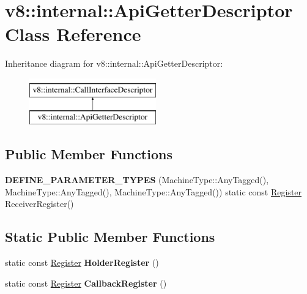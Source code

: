 \hypertarget{classv8_1_1internal_1_1ApiGetterDescriptor}{}\section{v8\+:\+:internal\+:\+:Api\+Getter\+Descriptor Class Reference}
\label{classv8_1_1internal_1_1ApiGetterDescriptor}
Inheritance diagram for v8\+:\+:internal\+:\+:Api\+Getter\+Descriptor\+:\begin{figure}[H]
\begin{center}
\leavevmode
\includegraphics[height=2.000000cm]{classv8_1_1internal_1_1ApiGetterDescriptor}
\end{center}
\end{figure}
\subsection*{Public Member Functions}
\begin{DoxyCompactItemize}
\item 
\mbox{\label{classv8_1_1internal_1_1ApiGetterDescriptor_ae461b846579b9b7371ec3172871acedd}} 
{\bfseries D\+E\+F\+I\+N\+E\+\_\+\+P\+A\+R\+A\+M\+E\+T\+E\+R\+\_\+\+T\+Y\+P\+ES} (Machine\+Type\+::\+Any\+Tagged(), Machine\+Type\+::\+Any\+Tagged(), Machine\+Type\+::\+Any\+Tagged()) static const \mbox{\hyperlink{classv8_1_1internal_1_1Register}{Register}} Receiver\+Register()
\end{DoxyCompactItemize}
\subsection*{Static Public Member Functions}
\begin{DoxyCompactItemize}
\item 
\mbox{\label{classv8_1_1internal_1_1ApiGetterDescriptor_a3a2ad818edc83502718c466b5dad01b5}} 
static const \mbox{\hyperlink{classv8_1_1internal_1_1Register}{Register}} {\bfseries Holder\+Register} ()
\item 
\mbox{\label{classv8_1_1internal_1_1ApiGetterDescriptor_a1289ae62e1bf71022cdedd9d84ca1082}} 
static const \mbox{\hyperlink{classv8_1_1internal_1_1Register}{Register}} {\bfseries Callback\+Register} ()
\end{DoxyCompactItemize}
